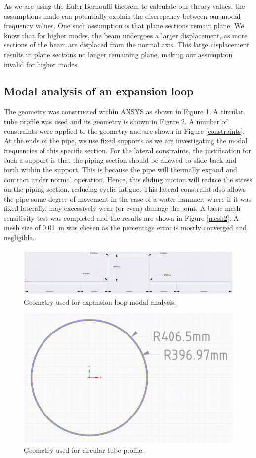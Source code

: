As we are using the Euler-Bernoulli theorem to calculate our theory values, the assumptions made can potentially explain the discrepancy between our modal frequency values. One such assumption is that plane sections remain plane. We know that for higher modes, the beam undergoes a larger displacement, as more sections of the beam are displaced from the normal axis. This large displacement results in plane sections no longer remaining plane, making our assumption invalid for higher modes.
\subsection{Modal analysis of an expansion loop}
The geometry was constructed within ANSYS as shown in Figure \ref{expansionLoopGeometry}. A circular tube profile was used and its geometry is shown in Figure \ref{crossSection}. A number of constraints were applied to the geometry and are shown in Figure \ref{constraints}. At the ends of the pipe, we use fixed supports as we are investigating the modal frequencies of this specific section. For the lateral constraints, the justification for such a support is that the piping section should be allowed to slide back and forth within the support. This is because the pipe will thermally expand and contract under normal operation. Hence, this sliding motion will reduce the stress on the piping section, reducing cyclic fatigue. This lateral constraint also allows the pipe some degree of movement in the case of a water hammer, where if it was fixed laterally, may excessively wear (or even) damage the joint. A basic mesh sensitivity test was completed and the results are shown in Figure \ref{mesh2}. A mesh size of \SI{0.01}{\meter} was chosen as the percentage error is mostly converged and negligible.
\begin{figure}[H]
    \centering
    \includegraphics[width = \textwidth]{img/fig7.png}
    \caption{Geometry used for expansion loop modal analysis.}
    \label{expansionLoopGeometry}
\end{figure}

\begin{figure}[H]
    \centering
    \includegraphics[width =0.6 \textwidth]{img/fig9.png}
    \caption{Geometry used for circular tube profile.}
    \label{crossSection}
\end{figure}

